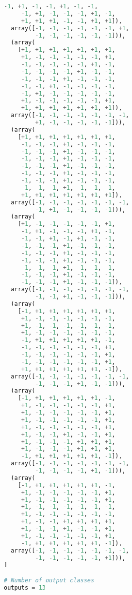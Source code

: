 \documentclass{article}
\begin{document}
\begin{lstlisting}[language=Python]
     -1, +1, -1, -1, +1, -1, -1, 
     -1, +1, -1, -1, -1, +1, -1, 
     +1, +1, +1, -1, -1, +1, +1]), 
  array([-1, -1, -1, -1, -1, -1, +1, 
         -1, -1, -1, -1, -1, -1])),
  (array(
    [+1, +1, +1, +1, +1, +1, +1, 
     +1, -1, -1, -1, -1, -1, +1, 
     -1, -1, -1, -1, -1, +1, -1, 
     -1, -1, -1, -1, +1, -1, -1, 
     -1, -1, -1, +1, -1, -1, -1, 
     -1, -1, +1, -1, -1, -1, -1, 
     -1, +1, -1, -1, -1, -1, -1, 
     +1, -1, -1, -1, -1, -1, +1, 
     +1, +1, +1, +1, +1, +1, +1]), 
  array([-1, -1, -1, -1, -1, -1, -1, 
         +1, -1, -1, -1, -1, -1])),
  (array(
    [+1, +1, +1, +1, +1, +1, +1, 
     -1, -1, -1, +1, -1, -1, -1, 
     -1, -1, -1, +1, -1, -1, -1,
     -1, -1, -1, +1, -1, -1, -1, 
     -1, -1, -1, +1, -1, -1, -1, 
     -1, -1, -1, +1, -1, -1, -1, 
     -1, -1, -1, +1, -1, -1, -1, 
     -1, -1, -1, +1, -1, -1, -1, 
     +1, +1, +1, +1, +1, +1, +1]), 
  array([-1, -1, -1, -1, -1, -1, -1, 
         -1, +1, -1, -1, -1, -1])),
  (array(
    [+1, -1, -1, -1, -1, -1, +1, 
     -1, +1, -1, -1, -1, +1, -1, 
     -1, -1, +1, -1, +1, -1, -1,
     -1, -1, -1, +1, -1, -1, -1, 
     -1, -1, -1, +1, -1, -1, -1, 
     -1, -1, -1, +1, -1, -1, -1, 
     -1, -1, -1, +1, -1, -1, -1, 
     -1, -1, -1, +1, -1, -1, -1, 
     -1, -1, -1, +1, -1, -1, -1]), 
  array([-1, -1, -1, -1, -1, -1, -1, 
         -1, -1, +1, -1, -1, -1])),
  (array(
    [-1, +1, +1, +1, +1, +1, +1, 
     +1, -1, -1, -1, -1, -1, -1, 
     +1, -1, -1, -1, -1, -1, -1, 
     +1, -1, -1, -1, -1, -1, -1, 
     -1, +1, +1, +1, +1, +1, -1, 
     -1, -1, -1, -1, -1, -1, +1, 
     -1, -1, -1, -1, -1, -1, +1, 
     -1, -1, -1, -1, -1, -1, +1, 
     +1, +1, +1, +1, +1, +1, -1]), 
  array([-1, -1, -1, -1, -1, -1, -1, 
         -1, -1, -1, +1, -1, -1])),
  (array(
    [-1, +1, +1, +1, +1, +1, -1, 
     +1, -1, -1, -1, -1, -1, +1, 
     +1, -1, -1, -1, -1, -1, +1, 
     +1, -1, -1, -1, -1, -1, +1, 
     +1, -1, -1, -1, -1, -1, +1, 
     +1, -1, -1, +1, -1, -1, +1, 
     +1, -1, -1, -1, +1, +1, +1, 
     +1, -1, -1, -1, +1, +1, +1, 
     -1, +1, +1, +1, +1, +1, -1]), 
  array([-1, -1, -1, -1, -1, -1, -1, 
         -1, -1, -1, -1, +1, -1])),
  (array(
    [-1, +1, +1, +1, +1, +1, -1, 
     +1, -1, -1, -1, -1, -1, +1, 
     +1, -1, -1, -1, -1, -1, +1, 
     +1, -1, -1, -1, -1, -1, -1, 
     +1, -1, -1, -1, -1, -1, -1, 
     +1, -1, -1, +1, +1, +1, +1, 
     +1, -1, -1, +1, -1, -1, +1, 
     +1, -1, -1, -1, -1, -1, +1, 
     -1, +1, +1, +1, +1, +1, -1]),
  array([-1, -1, -1, -1, -1, -1, -1, 
         -1, -1, -1, -1, -1, +1])),
]

# Number of output classes
outputs = 13


\end{lstlisting}
\end{document}
